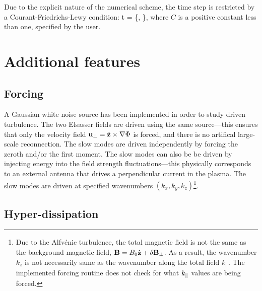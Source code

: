     Due to the explicit nature of the numerical scheme, the time step is restricted by a
    Courant-Friedrichs-Lewy condition:
    \beq
        \delta t = \times{}\lt\{,
        \rt\},
    \eeq
    where $C$ is a positive constant less than one, specified by the user.

\section{Additional features}

    \subsection{Forcing}
        
        A Gaussian white noise source has been implemented in order to study driven
        turbulence. The two Elsasser fields are driven
        using the same source---this ensures that only the velocity field
        $\mathbf{u}_\perp = \hat{\mathbf{z}}\times \nabla \Phi$ is forced, and there is no
        artifical large-scale reconnection. The slow modes are driven independently by
        forcing the zeroth and/or the first moment. 
        The slow modes can also be be driven by injecting energy into the field strength
        fluctuations---this physically corresponds to an external antenna that 
        drives a perpendicular current in the plasma. The slow modes are driven at
        specified wavenumbers $(k_x, k_y, k_z)$\footnote{Due to the Alfv\'{e}nic turbulence, the
        total magnetic field is not the same as the background magnetic field, $\mathbf{B} =
        B_0\hat{\mathbf{z}} + \delta \mathbf{B}_\perp$. As a result, the wavenumber $k_z$ is not
        necessarily same as the wavenumber along the total field $k_\parallel$. The
        implemented forcing routine does not check for what $k_\parallel$ values are being
        forced.}.






    \subsection{Hyper-dissipation}
    \label{gandalf:sec:hyper}
       
